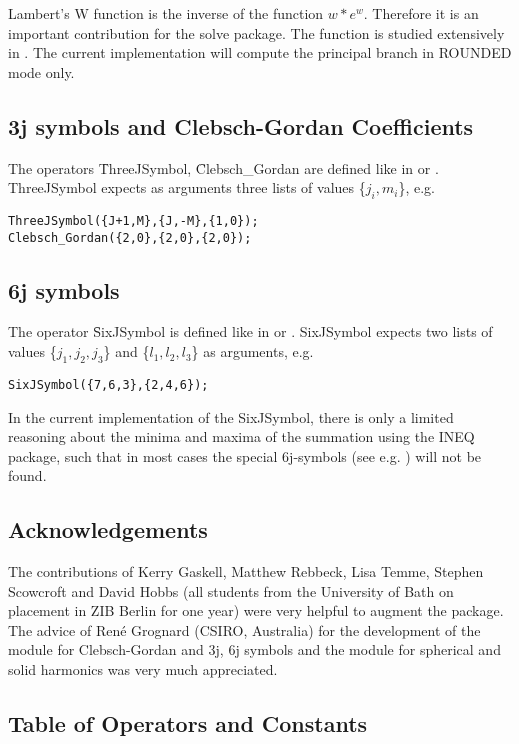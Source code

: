 Lambert's W function is the inverse of the function  $w*e^w$.
Therefore it is an important contribution for the solve package.
The function is studied extensively in \cite{Corless:92}.  
The current implementation will compute the principal branch in
ROUNDED mode only.

\subsection{3j symbols and Clebsch-Gordan Coefficients}
The operators \f{ThreeJSymbol}, \f{Clebsch\_Gordan} are defined like 
in \cite{Landolt:68} or \cite{Edmonds:57}. ThreeJSymbol expects as arguments
three lists of values \{$j_i,m_i$\}, e.g.

\begin{verbatim}
ThreeJSymbol({J+1,M},{J,-M},{1,0});
Clebsch_Gordan({2,0},{2,0},{2,0});
\end{verbatim}

\subsection{6j symbols }
The operator \f{SixJSymbol} is defined like
in \cite{Landolt:68} or \cite{Edmonds:57}.
SixJSymbol expects two lists of values \{$j_1,j_2,j_3$\} and
 \{$l_1,l_2,l_3$\} as arguments, e.g.

\begin{verbatim}
SixJSymbol({7,6,3},{2,4,6});
\end{verbatim}

In the current implementation of the SixJSymbol, there is only a limited
reasoning about the minima and maxima of the summation using
the INEQ package, such that in most
cases the special 6j-symbols (see e.g. \cite{Landolt:68})
will not be found.



\subsection{Acknowledgements}

The contributions of Kerry Gaskell, Matthew Rebbeck, Lisa Temme,
Stephen Scowcroft and David Hobbs (all students from the University of Bath
on placement in ZIB Berlin for one year) were very helpful
to augment the package. The advice of Ren\'e Grognard (CSIRO, Australia)
for the development of the module for Clebsch-Gordan and 3j, 6j symbols
and the module for spherical and solid harmonics was very much appreciated.

\subsection{Table of Operators and Constants}

